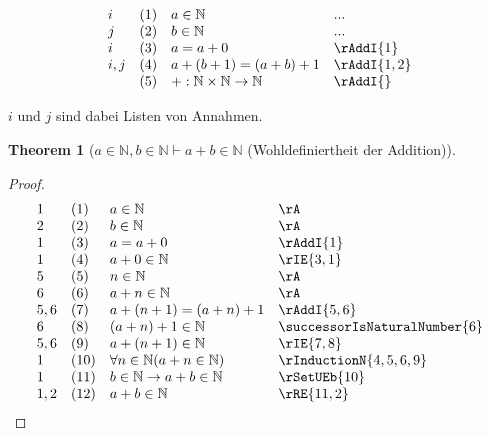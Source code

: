 \documentclass{book}
\theoremstyle{plain}
\newtheorem{theorem}{Theorem}
\theoremstyle{remark}
\theoremstyle{definition}
\begin{document}
\[
\begin{array}{llll}
	i & (1) & a \in \mathbb{N} & ... \\
	j & (2) & b \in \mathbb{N} & ... \\
        i & (3) & a = a + 0 & \rAddI{1} \\
	i,j & (4) & a + (b+1) = (a+b)+1 & \rAddI{1,2} \\
            & (5) & +:\mathbb{N}\times\mathbb{N}\rightarrow\mathbb{N} & \rAddI{} \\
\end{array}
\]

\(i\) und \(j\) sind dabei Listen von Annahmen.

\label{aInNaturalwbInNaturalImpaPlusbInNatural}
\begin{theorem}[\(a\in\mathbb{N}, b\in\mathbb{N}\vdash a+b\in\mathbb{N}\) (Wohldefiniertheit der Addition)]
\end{theorem}
\begin{proof}
	\[
	\begin{array}{llll}
		1   &  (1) & a\in\mathbb{N} & \rA \\
            2   &  (2) & b\in\mathbb{N} & \rA \\
            1   &  (3) & a=a+0 & \rAddI{1} \\
            1   &  (4) & a+0\in\mathbb{N} & \rIE{3,1} \\
            5   &  (5) & n\in \mathbb{N} & \rA \\
            6   &  (6) & a+n\in \mathbb{N} & \rA \\
            5,6 &  (7) & a+(n+1)=(a+n)+1 & \rAddI{5,6} \\
            6   &  (8) & (a+n)+1\in\mathbb{N} & \successorIsNaturalNumber{6} \\
            5,6 &  (9) & a+(n+1)\in\mathbb{N} & \rIE{7,8} \\
            1   &  (10) & \forall n\in\mathbb{N}(a+n\in\mathbb{N}) & \rInductionN{4,5,6,9} \\
            1   &  (11) & b\in\mathbb{N}\rightarrow a+b\in\mathbb{N} & \rSetUEb{10} \\
            1,2 &  (12) & a+b\in\mathbb{N} & \rRE{11,2} \\
	\end{array}
	\]
\end{proof}
\end{document}
